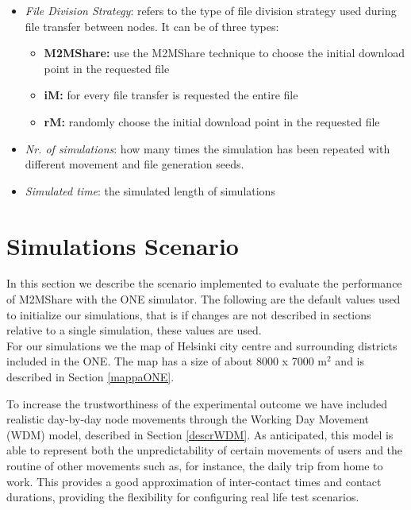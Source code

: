 \begin{itemize}
\item \textit{File Division Strategy}: refers to the type of file division strategy used during file transfer between nodes. It can be of three types:
\begin{itemize}
\item \textbf{M2MShare:} use the M2MShare technique to choose the initial download point in the requested file
\item \textbf{iM:} for every file transfer is requested the entire file
\item \textbf{rM:} randomly choose the initial download point in the requested file
\end{itemize}

\item \textit{Nr. of simulations}: how many times the simulation has been repeated with different movement and file generation seeds.

\item \textit{Simulated time}: the simulated length of simulations

\end{itemize}


\section{Simulations Scenario}
In this section we describe the scenario implemented to evaluate the performance of M2MShare with the ONE simulator. The following are the default values used to initialize our simulations, that is if changes are not described in sections relative to a single simulation, these values are used.
\\

For our simulations we the map of Helsinki city centre and surrounding districts included in the ONE. The map has a size of about 8000 x 7000 m$^{2}$ and is described in Section \ref{mappaONE}. 


To increase the trustworthiness of the experimental outcome we have included realistic day-by-day node movements through the Working Day Movement (WDM) model, described in Section \ref{descrWDM}. As anticipated, this model is able to represent both the unpredictability of certain movements of users and the routine of other movements such as, for instance, the daily trip from home to work. This provides a good approximation of inter-contact times and contact durations, providing the flexibility for configuring real life test scenarios.
\\

